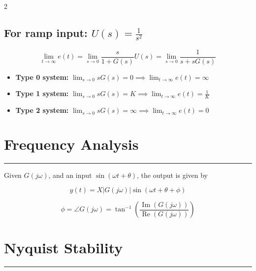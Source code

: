 \documentclass[letterpaper,10pt]{article}
\let\oldsection\section
\renewcommand{\section}[1]{%
\vspace{-1em}
  \oldsection{#1}%
  \par\vspace{-2em}%
  \noindent\rule{0.5\textwidth}{0.5pt}%
  \vspace{0em}%
}
\begin{document}
\begin{multicols}{2}
\subsection*{For ramp input: $U(s) = \frac{1}{s^2}$}
\[
\lim_{t \to \infty} e(t) = \lim_{s \to 0} \frac{s}{1 + G(s)} U(s) 
= \lim_{s \to 0} \frac{1}{s + sG(s)}
\]

\begin{itemize}
    \item \textbf{Type 0 system:} $\lim_{s \to 0} sG(s) = 0 \implies \lim_{t \to \infty} e(t) = \infty$
    \item \textbf{Type 1 system:} $\lim_{s \to 0} sG(s) = K \implies \lim_{t \to \infty} e(t) = \frac{1}{K}$
    \item \textbf{Type 2 system:} $\lim_{s \to 0} sG(s) = \infty \implies \lim_{t \to \infty} e(t) = 0$
\end{itemize}
\section{Frequency Analysis}
Given $ G(j\omega)$, and an input $\sin(\omega t +\theta)$, the output is given by

\[
y(t) = X|G(j\omega)| \sin(\omega t + \theta + \phi)
\]

\[
\phi = \angle G(j\omega) = \tan^{-1} \left(\frac{\operatorname{Im}(G(j\omega))}{\operatorname{Re}(G(j\omega))}\right)
\]

\section{Nyquist Stability}


\end{multicols}
\end{document}
